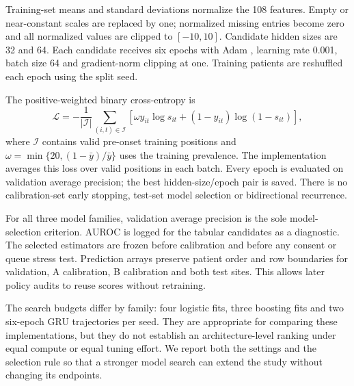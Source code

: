 Training-set means and standard deviations normalize the 108 features. Empty or near-constant scales are replaced by one; normalized missing entries become zero and all normalized values are clipped to $[-10,10]$. Candidate hidden sizes are 32 and 64. Each candidate receives six epochs with Adam \citep{adam}, learning rate 0.001, batch size 64 and gradient-norm clipping at one. Training patients are reshuffled each epoch using the split seed.

The positive-weighted binary cross-entropy is
\begin{equation*}
 \mathcal L=-\frac{1}{|\mathcal I|}\sum_{(i,t)\in\mathcal I}
 \left[\omega y_{it}\log s_{it}+(1-y_{it})\log(1-s_{it})\right],
\end{equation*}
where $\mathcal I$ contains valid pre-onset training positions and $\omega=\min\{20,(1-\bar y)/\bar y\}$ uses the training prevalence. The implementation averages this loss over valid positions in each batch. Every epoch is evaluated on validation average precision; the best hidden-size/epoch pair is saved. There is no calibration-set early stopping, test-set model selection or bidirectional recurrence.

For all three model families, validation average precision is the sole model-selection criterion. AUROC is logged for the tabular candidates as a diagnostic. The selected estimators are frozen before calibration and before any consent or queue stress test. Prediction arrays preserve patient order and row boundaries for validation, A calibration, B calibration and both test sites. This allows later policy audits to reuse scores without retraining.

The search budgets differ by family: four logistic fits, three boosting fits and two six-epoch GRU trajectories per seed. They are appropriate for comparing these implementations, but they do not establish an architecture-level ranking under equal compute or equal tuning effort. We report both the settings and the selection rule so that a stronger model search can extend the study without changing its endpoints.
